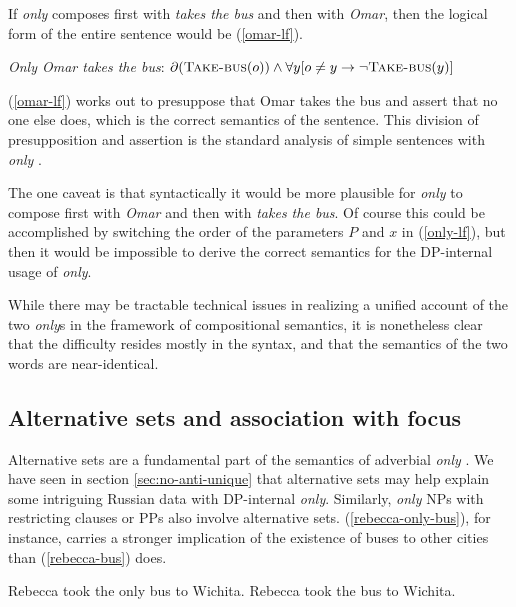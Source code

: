 If \textit{only} composes first with \textit{takes the bus} and then with \textit{Omar}, then the logical form of the entire sentence would be (\ref{omar-lf}).

\begin{exe}
	\ex \label{omar-lf} \textit{Only Omar takes the bus}: $\partial(\textsc{Take-bus}(o)) \land \forall y [ o \ne y \to \neg \textsc{Take-bus}(y) ]$
\end{exe}

(\ref{omar-lf}) works out to presuppose that Omar takes the bus and assert that no one else does, which is the correct semantics of the sentence. This division of presupposition and assertion is the standard analysis of simple sentences with \textit{only} \citep{horn69}.

The one caveat is that syntactically it would be more plausible for \textit{only} to compose first with \textit{Omar} and then with \textit{takes the bus}. Of course this could be accomplished by switching the order of the parameters $P$ and $x$ in (\ref{only-lf}), but then it would be impossible to derive the correct semantics for the DP-internal usage of \textit{only}.

While there may be tractable technical issues in realizing a unified account of the two \textit{only}s in the framework of compositional semantics, it is nonetheless clear that the difficulty resides mostly in the syntax, and that the semantics of the two words are near-identical.


\subsection{Alternative sets and association with focus}
Alternative sets are a fundamental part of the semantics of adverbial \textit{only} \citep{rooth85, rooth92}. We have seen in section \ref{sec:no-anti-unique} that alternative sets may help explain some intriguing Russian data with DP-internal \textit{only}. Similarly, \textit{only} NPs with restricting clauses or PPs also involve alternative sets. (\ref{rebecca-only-bus}), for instance, carries a stronger implication of the existence of buses to other cities than (\ref{rebecca-bus}) does.

\begin{exe}
	\ex \label{rebecca-only-bus} Rebecca took the only bus to Wichita.
	\ex \label{rebecca-bus} Rebecca took the bus to Wichita.
\end{exe}

